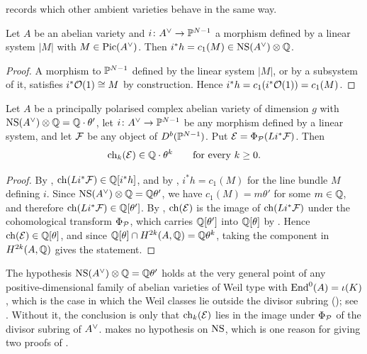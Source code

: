  records which other ambient varieties behave in the
same way.

\begin{lemma}\label{lem:hyperclass}
Let $A$ be an abelian variety and $i\colon A^{\vee}\to\mathbb{P}^{N-1}$ a morphism defined
by a linear system $|M|$ with $M\in\operatorname{Pic}(A^{\vee})$. Then
$i^{*}h=c_{1}(M)\in\mathrm{NS}(A^{\vee})\otimes\mathbb{Q}$.
\end{lemma}

\begin{proof}
A morphism to $\mathbb{P}^{N-1}$ defined by the linear system $|M|$, or by a
subsystem of it, satisfies $i^{*}\mathcal{O}(1)\cong M$ by construction. Hence
$i^{*}h=c_{1}(i^{*}\mathcal{O}(1))=c_{1}(M)$.
\end{proof}

\begin{theorem}\label{thm:divisor}
Let $A$ be a principally polarised complex abelian variety of dimension $g$
with $\mathrm{NS}(A^{\vee})\otimes\mathbb{Q}=\mathbb{Q}\cdot\theta'$, let $i\colon A^{\vee}\to\mathbb{P}^{N-1}$ be any
morphism defined by a linear system, and let $\mathcal{F}$ be any object of
$D^{b}(\mathbb{P}^{N-1})$. Put $\mathcal{E}=\Phi_{\mathcal{P}}(Li^{*}\mathcal{F})$. Then
\[
  \operatorname{ch}_{k}(\mathcal{E})\in\mathbb{Q}\cdot\theta^{k}\qquad\text{for every }k\ge0 .
\]
\end{theorem}

\begin{proof}
By , $\operatorname{ch}(Li^{*}\mathcal{F})\in\mathbb{Q}[i^{*}h]$, and by
, $i^{*}h=c_{1}(M)$ for the line bundle $M$ defining $i$.
Since $\mathrm{NS}(A^{\vee})\otimes\mathbb{Q}=\mathbb{Q}\theta'$, we have $c_{1}(M)=m\theta'$ for some
$m\in\mathbb{Q}$, and therefore $\operatorname{ch}(Li^{*}\mathcal{F})\in\mathbb{Q}[\theta']$. By
, $\operatorname{ch}(\mathcal{E})$ is the image of $\operatorname{ch}(Li^{*}\mathcal{F})$ under the
cohomological transform $\Phi_{\mathcal{P}}$, which carries $\mathbb{Q}[\theta']$ into
$\mathbb{Q}[\theta]$ by . Hence $\operatorname{ch}(\mathcal{E})\in\mathbb{Q}[\theta]$, and
since $\mathbb{Q}[\theta]\cap H^{2k}(A,\mathbb{Q})=\mathbb{Q}\theta^{k}$, taking the component in
$H^{2k}(A,\mathbb{Q})$ gives the statement.
\end{proof}

\begin{remark}\label{rem:NShyp}
The hypothesis $\mathrm{NS}(A^{\vee})\otimes\mathbb{Q}=\mathbb{Q}\theta'$ holds at the very general point
of any positive-dimensional family of abelian varieties of Weil type with
$\operatorname{End}^{0}(A)=\iota(K)$, which is the case in which the Weil classes lie
outside the divisor subring (); see .
Without it, the conclusion is only that $\operatorname{ch}_{k}(\mathcal{E})$ lies in the image
under $\Phi_{\mathcal{P}}$ of the divisor subring of $A^{\vee}$. 
makes no hypothesis on $\mathrm{NS}$, which is one reason for giving two proofs of
.
\end{remark}

